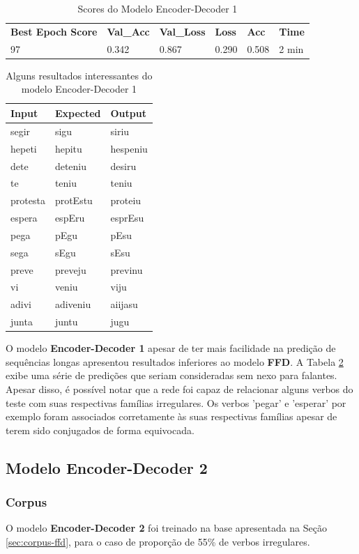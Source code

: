 \begin{table}[H]
\centering
\begin{tabular}{llllll}
\textbf{Best Epoch Score} & \textbf{Val\_Acc} & \textbf{Val\_Loss} & \textbf{Loss} & \textbf{Acc} & \textbf{Time} \\
97 & 0.342 & 0.867 & 0.290 & 0.508 & 2 min
\end{tabular}
\caption{Scores do Modelo Encoder-Decoder 1}
\label{tab:res-enc-dec-1}
\end{table}

\begin{table}[H]
\centering
\begin{tabular}{lll}
\textbf{Input} & \textbf{Expected} & \textbf{Output} \\ \hline
segir& sigu& siriu\\
hepeti& hepitu& hespeniu\\
dete& deteniu& desiru\\
te& teniu& teniu\\
protesta& protEstu& proteiu\\
espera& espEru& esprEsu\\
pega& pEgu& pEsu\\
sega& sEgu& sEsu\\
preve& preveju& previnu\\
vi& veniu& viju\\
adivi& adiveniu& aiijasu\\
junta& juntu& jugu\\
\end{tabular}
\caption{Alguns resultados interessantes do modelo Encoder-Decoder 1}
\label{tab:res1}
\end{table}

O modelo \textbf{Encoder-Decoder 1} apesar de ter mais facilidade na predição de sequências longas apresentou resultados inferiores ao modelo \textbf{FFD}. A Tabela \ref{tab:res1} exibe uma série de predições que seriam consideradas sem nexo para falantes. Apesar disso, é possível notar que a rede foi capaz de relacionar alguns verbos do teste com suas respectivas famílias irregulares. Os verbos 'pegar' e 'esperar' por exemplo foram associados corretamente às suas respectivas famílias apesar de terem sido conjugados de forma equivocada.

\subsection{Modelo Encoder-Decoder 2}

\subsubsection{Corpus}
O modelo \textbf{Encoder-Decoder 2} foi treinado na base apresentada na Seção \ref{sec:corpus-ffd}, para o caso de proporção de 55\% de verbos irregulares. 

